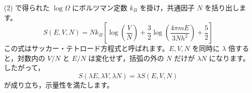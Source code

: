 \begin{solutionparts}
(2) で得られた $\log \Omega$ にボルツマン定数 $k_B$ を掛け，共通因子 $N$ を括り出します。
\begin{equation*}
S(E, V, N) = N k_B \left[ \log \left( \frac{V}{N} \right) + \frac{3}{2} \log \left( \frac{4\pi m E}{3N h^2} \right) + \frac{5}{2} \right]
\end{equation*}
この式はサッカー・テトロード方程式と呼ばれます。$E,V,N$ を同時に $\lambda$ 倍すると，対数内の $V/N$ と $E/N$ は変化せず，括弧の外の $N$ だけが $\lambda N$ になります。したがって，
\begin{equation*}
S(\lambda E,\lambda V,\lambda N)=\lambda S(E,V,N)
\end{equation*}
が成り立ち，示量性を満たします。

\end{solutionparts}
